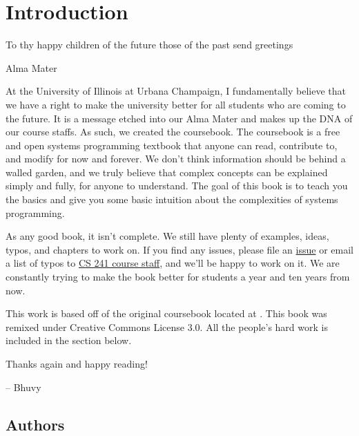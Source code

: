 \chapter{Introduction}

\epigraph{To thy happy children of the future those of the past send greetings}{Alma Mater}

At the University of Illinois at Urbana Champaign, I fundamentally believe that we have a right to make the university better for all students who are coming to the future.
It is a message etched into our Alma Mater and makes up the DNA of our course staffs.
As such, we created the coursebook.
The coursebook is a free and open systems programming textbook that anyone can read, contribute to, and modify for now and forever.
We don't think information should be behind a walled garden, and we truly believe that complex concepts can be explained simply and fully, for anyone to understand.
The goal of this book is to teach you the basics and give you some basic intuition about the complexities of systems programming.

As any good book, it isn't complete.
We still have plenty of examples, ideas, typos, and chapters to work on.
If you find any issues, please file an \href{https://github.com/illinois-cs241/coursebook/issues}{issue} or email a list of typos to \href{http://cs241.cs.illinois.edu/staff}{CS 241 course staff}, and we'll be happy to work on it.
We are constantly trying to make the book better for students a year and ten years from now.

This work is based off of the original coursebook located at .
This book was remixed under Creative Commons License 3.0.
All the people's hard work is included in the section below.

Thanks again and happy reading!

-- Bhuvy

\section{Authors}



